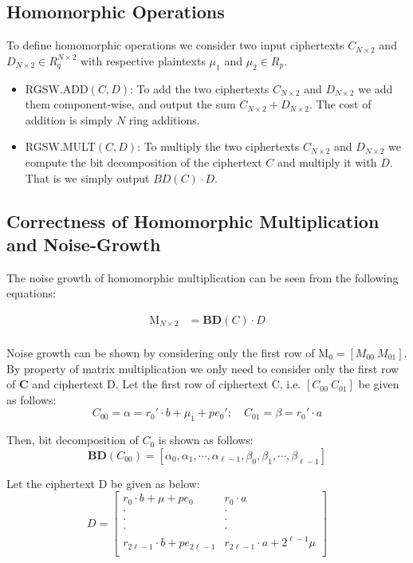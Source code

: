 \documentclass[10pt,journal,compsoc]{IEEEtran}
\theoremstyle{definition}
\begin{document}
\subsection{Homomorphic Operations}

To define homomorphic operations we consider two input ciphertexts $C_{N\times 2}$ and $D_{N\times 2} \in R_q^{N\times 2}$ with respective plaintexts $\mu_1$ and $\mu_2 \in R_p$.

\begin{itemize}
\item RGSW.ADD$\left(C,D\right)$: To add the two ciphertexts $C_{N\times 2}$ and $D_{N\times 2}$ we add them component-wise, and output the sum $C_{N\times 2} + D_{N\times 2}$. The cost of addition is simply $N$ ring additions.
\item RGSW.MULT$\left(C,D\right)$: To multiply the two ciphertexts $C_{N\times 2}$ and $D_{N\times 2}$ we compute the bit decomposition of the ciphertext $C$ and multiply it with $D$. That is we simply output $BD\left(C\right)\cdot D.$
\end{itemize}

\subsection{Correctness of Homomorphic Multiplication and Noise-Growth}

The noise growth of homomorphic multiplication can be seen from the following equations:

\begin{equation*}
\begin{split}
\textrm{M}_{N\times 2} & = \textbf{BD}\left(C\right)\cdot D\\
\end{split}
\end{equation*}

Noise growth can be shown by considering only the first row of M$_0 = \left[ M_{00} \ M_{01} \right]$. By property of matrix multiplication we only need to consider only the first row of \textbf{C} and ciphertext D. Let the first row of ciphertext C, i.e. $\left[ C_{00} \ C_{01} \right]$ be given as follows:
$$ C_{00} = \alpha = r_0'\cdot b + \mu_1 + pe_0'; \quad C_{01} = \beta = r_0'\cdot a$$

Then, bit decomposition of $C_0$ is shown as follows:
$$\textbf{BD}\left(C_{00}\right) = \left[ \alpha_0,\alpha_1,\cdots ,\alpha_{\ell-1},\beta_0,\beta_1,\cdots,\beta_{\ell-1}\right]$$

Let the ciphertext D be given as below:
\[
D =
  \begin{bmatrix}
    r_0\cdot b + \mu + pe_0 & r_0\cdot a \\
    \cdot & \cdot \\
    \cdot & \cdot \\
  	\cdot & \cdot \\      
     r_{2\ell - 1}\cdot b + pe_{2\ell - 1} & r_{2\ell - 1}\cdot a + 2^{\ell - 1}\mu\\
  \end{bmatrix}
\]
\end{document}
